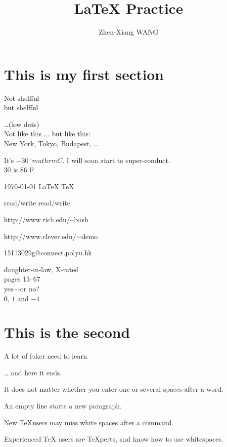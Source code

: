 \documentclass[11pt,twoside,a4paper]{article}
\author{Zhen-Xiang WANG}
\title{\LaTeX{} Practice}
\begin{document}
    \thispagestyle{empty}
    \maketitle
    \tableofcontents

    \section{This is my first section}\label{sec:thisIsMyFirstSection}


    \Large Not shelfful\\
    but shelf\mbox{}ful

    \ldots (low dots)\\
    Not like this ... but like this:\\
    New York, Tokyo, Budapest, \ldots

    It's $-30\, ^{\circ}mathrm{C}$.
    I will soon start to
    super-conduct.\\
    30 \textcelsius{} is %
    86 \textdegree{}F

    \today{} \LaTeX{} \LaTeXe{} \TeX

    read/write\newline
    read\slash write

    http://www.rich.edu/\~{}bush

    http://www.clever.edu/$\sim$demo

    15113029g@connect.polyu.hk

    daughter-in-law, X-rated\\
    pages 13--67\\
    yes---or no? \\
    $0$, $1$ and $-1$

    \section{This is the second}\label{sec:thisIsMySecondSection}
    A lot of fuker need to learn.

    \ldots{} and here it ends.

    It does not matter whether you
    enter one or several spaces
    after a word.

    An empty line starts a new
    paragraph.

    New \TeX users may miss white spaces after a command.

    Experienced \TeX{} users are \TeX perts, and know how to use whitespaces.
\end{document}
